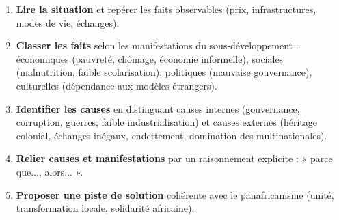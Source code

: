 \documentclass[11pt]{article}
\newcommand{\cle}[1]{{\popxbold\color{popdark}#1}}
\begin{document}
\begin{methode}
\begin{enumerate}
\item \textbf{Lire la situation} et repérer les faits observables (prix, infrastructures, modes de vie, échanges).
\item \textbf{Classer les faits} selon les \cle{manifestations} du sous-développement : économiques (pauvreté, chômage, économie informelle), sociales (malnutrition, faible scolarisation), politiques (mauvaise gouvernance), culturelles (dépendance aux modèles étrangers).
\item \textbf{Identifier les causes} en distinguant causes \cle{internes} (gouvernance, corruption, guerres, faible industrialisation) et causes \cle{externes} (héritage colonial, échanges inégaux, endettement, domination des multinationales).
\item \textbf{Relier causes et manifestations} par un raisonnement explicite : « parce que..., alors... ».
\item \textbf{Proposer une piste de solution} cohérente avec le panafricanisme (unité, transformation locale, solidarité africaine).
\end{enumerate}
\end{methode}
\end{document}
